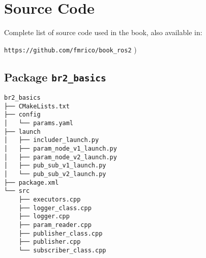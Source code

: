 
\appendix

\chapter[Source Code]{Source Code}
\label{cap:source}
Complete list of source code used in the book, also available in:

\vspace{0.5cm}
\large
\texttt{https://github.com/fmrico/book\_ros2}
\normalsize
)
\section{Package \texttt{br2\_basics}}
\label{sec:anex:br2_basics}

 \footnotesize
\begin{tcolorbox}[sharp corners, colframe=gray!80, colback=LightGray, left=0pt, top=0pt, bottom=0pt, title=Package \texttt{br2\_basics}]
  \begin{verbatim}
br2_basics
├── CMakeLists.txt
├── config
│   └── params.yaml
├── launch
│   ├── includer_launch.py
│   ├── param_node_v1_launch.py
│   ├── param_node_v2_launch.py
│   ├── pub_sub_v1_launch.py
│   └── pub_sub_v2_launch.py
├── package.xml
└── src
    ├── executors.cpp
    ├── logger_class.cpp
    ├── logger.cpp
    ├── param_reader.cpp
    ├── publisher_class.cpp
    ├── publisher.cpp
    └── subscriber_class.cpp    \end{verbatim}
    \end{tcolorbox}
  \normalsize

